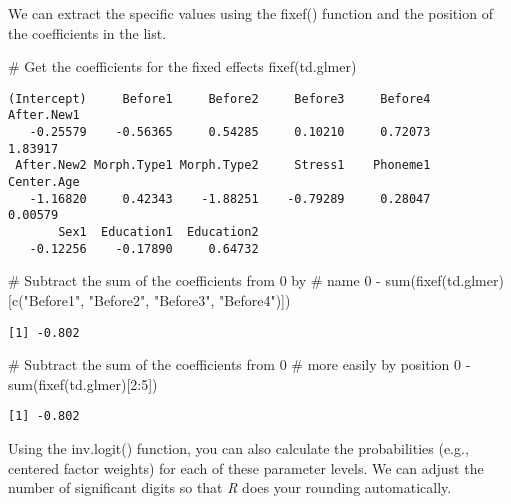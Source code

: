\documentclass[
  10pt,
  letterpaper]{article}
\newenvironment{Shaded}{\begin{snugshade}}{\end{snugshade}}
\newcommand{\CommentTok}[1]{\textcolor[rgb]{0.37,0.37,0.37}{#1}}
\newcommand{\DecValTok}[1]{\textcolor[rgb]{0.68,0.00,0.00}{#1}}
\newcommand{\FunctionTok}[1]{\textcolor[rgb]{0.28,0.35,0.67}{#1}}
\newcommand{\NormalTok}[1]{\textcolor[rgb]{0.00,0.23,0.31}{#1}}
\newcommand{\SpecialCharTok}[1]{\textcolor[rgb]{0.37,0.37,0.37}{#1}}
\newcommand{\StringTok}[1]{\textcolor[rgb]{0.13,0.47,0.30}{#1}}
\renewcommand\texttt[1]{{\ttfamily\color{BrickRed}#1}}
\begin{document}
We can extract the specific values using the \texttt{fixef()} function
and the position of the coefficients in the list.

\begin{Shaded}
\begin{Highlighting}[]
\CommentTok{\# Get the coefficients for the fixed effects}
\FunctionTok{fixef}\NormalTok{(td.glmer)}
\end{Highlighting}
\end{Shaded}

\begin{verbatim}
(Intercept)     Before1     Before2     Before3     Before4  After.New1 
   -0.25579    -0.56365     0.54285     0.10210     0.72073     1.83917 
 After.New2 Morph.Type1 Morph.Type2     Stress1    Phoneme1  Center.Age 
   -1.16820     0.42343    -1.88251    -0.79289     0.28047     0.00579 
       Sex1  Education1  Education2 
   -0.12256    -0.17890     0.64732 
\end{verbatim}

\begin{Shaded}
\begin{Highlighting}[]
\CommentTok{\# Subtract the sum of the coefficients from 0 by}
\CommentTok{\# name}
\DecValTok{0} \SpecialCharTok{{-}} \FunctionTok{sum}\NormalTok{(}\FunctionTok{fixef}\NormalTok{(td.glmer)[}\FunctionTok{c}\NormalTok{(}\StringTok{"Before1"}\NormalTok{, }\StringTok{"Before2"}\NormalTok{, }\StringTok{"Before3"}\NormalTok{,}
    \StringTok{"Before4"}\NormalTok{)])}
\end{Highlighting}
\end{Shaded}

\begin{verbatim}
[1] -0.802
\end{verbatim}

\begin{Shaded}
\begin{Highlighting}[]
\CommentTok{\# Subtract the sum of the coefficients from 0}
\CommentTok{\# more easily by position}
\DecValTok{0} \SpecialCharTok{{-}} \FunctionTok{sum}\NormalTok{(}\FunctionTok{fixef}\NormalTok{(td.glmer)[}\DecValTok{2}\SpecialCharTok{:}\DecValTok{5}\NormalTok{])}
\end{Highlighting}
\end{Shaded}

\begin{verbatim}
[1] -0.802
\end{verbatim}

Using the \texttt{inv.logit()} function, you can also calculate the
probabilities (e.g., centered factor weights) for each of these
parameter levels. We can adjust the number of significant digits so that
\emph{R} does your rounding automatically.
\end{document}
